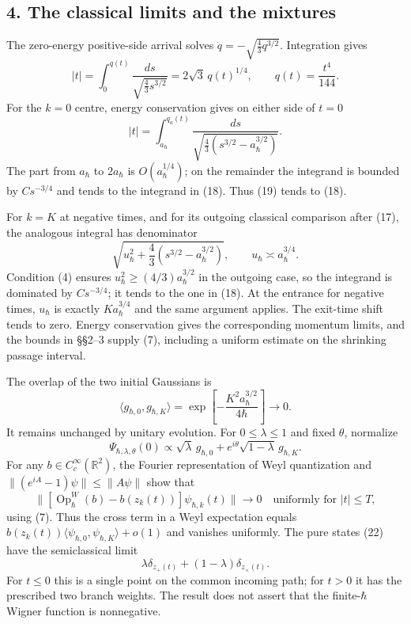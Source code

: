\documentclass[11pt,a4paper]{article}
\begin{document}
\subsection{4. The classical limits and the
mixtures}\label{the-classical-limits-and-the-mixtures}

The zero-energy positive-side arrival solves
\(\dot q=-\sqrt{\frac43q^{3/2}}\). Integration gives \[
 |t|=\int_0^{q(t)}
 \frac{ds}{\sqrt{\frac43s^{3/2}}}
 =2\sqrt3\,q(t)^{1/4},\qquad
 q(t)=\frac{t^4}{144}.\tag{18}
\] For the \(k=0\) centre, energy conservation gives on either side of
\(t=0\) \[
 |t|=\int_{a_\hbar}^{q_a(t)}
 \frac{ds}{\sqrt{\frac43(s^{3/2}-a_\hbar^{3/2})}}.\tag{19}
\] The part from \(a_\hbar\) to \(2a_\hbar\) is \(O(a_\hbar^{1/4})\); on
the remainder the integrand is bounded by \(Cs^{-3/4}\) and tends to the
integrand in (18). Thus (19) tends to (18).

For \(k=K\) at negative times, and for its outgoing classical comparison
after (17), the analogous integral has denominator \[
 \sqrt{u_\hbar^2+\frac43(s^{3/2}-a_\hbar^{3/2})},
 \qquad u_\hbar\asymp a_\hbar^{3/4}.\tag{20}
\] Condition (4) ensures \(u_\hbar^2\ge(4/3)a_\hbar^{3/2}\) in the
outgoing case, so the integrand is dominated by \(Cs^{-3/4}\); it tends
to the one in (18). At the entrance for negative times, \(u_\hbar\) is
exactly \(Ka_\hbar^{3/4}\) and the same argument applies. The exit-time
shift tends to zero. Energy conservation gives the corresponding
momentum limits, and the bounds in §§2--3 supply (7), including a
uniform estimate on the shrinking passage interval.

The overlap of the two initial Gaussians is
\[\langle g_{\hbar,0},g_{\hbar,K}\rangle
 =\exp\!\left[-\frac{K^2a_\hbar^{3/2}}{4\hbar}\right]
 \longrightarrow0.\tag{21}\] It remains unchanged by unitary evolution.
For \(0\le\lambda\le1\) and fixed \(\theta\), normalize \[
 \Psi_{\hbar,\lambda,\theta}(0)
 \propto\sqrt\lambda\,g_{\hbar,0}
       +e^{i\theta}\sqrt{1-\lambda}\,g_{\hbar,K}.\tag{22}
\] For any \(b\in C_c^\infty(\mathbb R^2)\), the Fourier representation
of Weyl quantization and \(\|(e^{iA}-1)\psi\|\le\|A\psi\|\) show that \[
 \|[\operatorname{Op}^W_\hbar(b)-b(z_k(t))]
                         \psi_{\hbar,k}(t)\|\longrightarrow0
 \quad\text{uniformly for }|t|\le T,\tag{23}
\] using (7). Thus the cross term in a Weyl expectation equals
\(b(z_k(t))\langle\psi_{\hbar,0},\psi_{\hbar,K}\rangle+o(1)\) and
vanishes uniformly. The pure states (22) have the semiclassical limit \[
 \lambda\delta_{z_+(t)}+(1-\lambda)\delta_{z_\times(t)}.\tag{24}
\] For \(t\le0\) this is a single point on the common incoming path; for
\(t>0\) it has the prescribed two branch weights. The result does not
assert that the finite-\(\hbar\) Wigner function is nonnegative.
\end{document}
